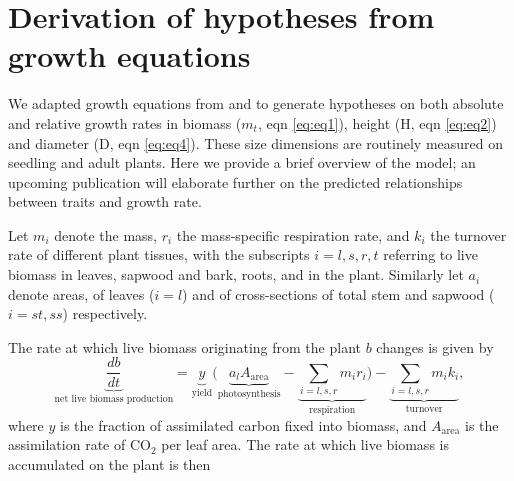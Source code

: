 \documentclass[a4paper]{article}\usepackage[]{graphicx}\usepackage[]{color}
\begin{document}
\begin{appendices} \label{sec:appendices}

\renewcommand{\thefigure}{A\arabic{figure}}
\renewcommand{\thetable}{A\arabic{table}}

\setcounter{figure}{0}
\setcounter{table}{0}

\section{Derivation of hypotheses from growth equations}\label{app:growth} 

We adapted growth equations from \cite{Falster:2011ii} and \cite{falster:2013} to generate hypotheses on both absolute and relative growth rates in biomass ($m_t$, eqn \ref{eq:eq1}), height (H, eqn \ref{eq:eq2}) and diameter (D, eqn \ref{eq:eq4}). These size dimensions are routinely measured on seedling and adult plants. Here we provide a brief overview of the model; an upcoming publication will elaborate further on the predicted relationships between traits and growth rate.

Let $m_i$ denote the mass, $r_i$ the mass-specific respiration rate, and $k_i$ the turnover rate of different plant tissues, with the subscripts $i=l,s,r,t$ referring to live biomass in leaves, sapwood and bark, roots, and in the plant. Similarly let $a_i$ denote areas, of leaves ($i=l$) and of cross-sections of total stem and sapwood ($i= st,ss$) respectively.

The rate at which live biomass originating from the plant $b$ changes is given by
\begin{equation}\label{eq:eq0}
\underbrace{\frac{db}{dt}}_{\text{net live biomass production}} = \underbrace{y}_{\text{yield}}  \big(\underbrace{a_{l} A_{\textrm{area}}}_{\text{photosynthesis}} - \underbrace{\sum_{i=l,s,r} m_{i} r_{i}}_{\text{respiration}}\big) - \underbrace{ \sum_{i=l,s,r} m_{i} k_{i}}_{\text{turnover}},
\end{equation}
where $y$ is the fraction of assimilated carbon fixed into biomass,  and  $A_{\textrm{area}}$ is the assimilation rate of CO$_{2}$ per leaf area. The rate at which live biomass is accumulated on the plant is then 


\end{appendices}
\end{document}

